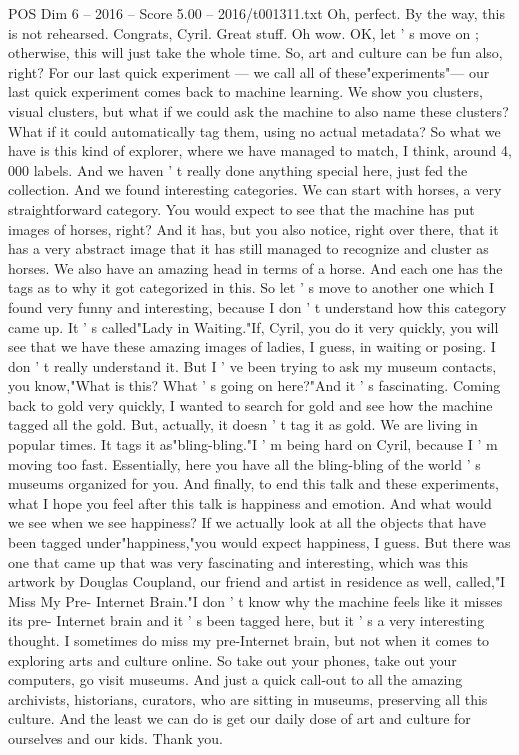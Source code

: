 \begin{textsample}{POS Dim 6 – 2016 – Score 5.00 – 2016/t001311.txt}
Oh, perfect.
By the way, this is not rehearsed.
Congrats, Cyril.
Great stuff.
Oh wow.
OK, let ' s move on ; otherwise, this will just take the whole time.
So, art and culture can be fun also, right?
For our last quick experiment — we call all of these"experiments"— our last quick experiment comes back to machine learning.
We show you clusters, visual clusters, but what if we could ask the machine to also name these clusters?
What if it could automatically tag them, using no actual metadata?
So what we have is this kind of explorer, where we have managed to match, I think, around 4, 000 labels.
And we haven ' t really done anything special here, just fed the collection.
And we found interesting categories.
We can start with horses, a very straightforward category.
You would expect to see that the machine has put images of horses, right?
And it has, but you also notice, right over there, that it has a very abstract image that it has still managed to recognize and cluster as horses.
We also have an amazing head in terms of a horse.
And each one has the tags as to why it got categorized in this.
So let ' s move to another one which I found very funny and interesting, because I don ' t understand how this category came up.
It ' s called"Lady in Waiting."If, Cyril, you do it very quickly, you will see that we have these amazing images of ladies, I guess, in waiting or posing.
I don ' t really understand it.
But I ' ve been trying to ask my museum contacts, you know,"What is this?
What ' s going on here?"And it ' s fascinating.
Coming back to gold very quickly, I wanted to search for gold and see how the machine tagged all the gold.
But, actually, it doesn ' t tag it as gold.
We are living in popular times.
It tags it as"bling-bling."I ' m being hard on Cyril, because I ' m moving too fast.
Essentially, here you have all the bling-bling of the world ' s museums organized for you.
And finally, to end this talk and these experiments, what I hope you feel after this talk is happiness and emotion.
And what would we see when we see happiness?
If we actually look at all the objects that have been tagged under"happiness,"you would expect happiness, I guess.
But there was one that came up that was very fascinating and interesting, which was this artwork by Douglas Coupland, our friend and artist in residence as well, called,"I Miss My Pre- Internet Brain."I don ' t know why the machine feels like it misses its pre- Internet brain and it ' s been tagged here, but it ' s a very interesting thought.
I sometimes do miss my pre-Internet brain, but not when it comes to exploring arts and culture online.
So take out your phones, take out your computers, go visit museums.
And just a quick call-out to all the amazing archivists, historians, curators, who are sitting in museums, preserving all this culture.
And the least we can do is get our daily dose of art and culture for ourselves and our kids.
Thank you.

\end{textsample}
